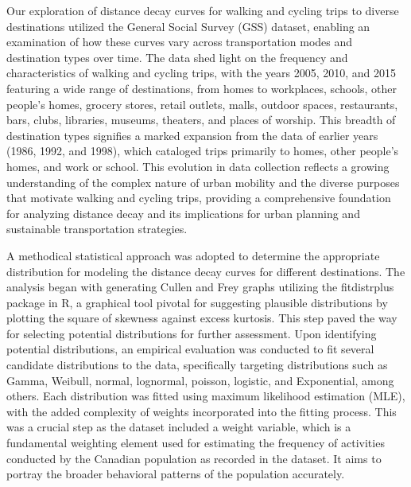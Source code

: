 \documentclass[
11pt, %
oneside, %
english, %
singlespacing, %
]{macthesis} %
\begin{document}
Our exploration of distance decay curves for walking and cycling trips to diverse destinations utilized the General Social Survey (GSS) dataset, enabling an examination of how these curves vary across transportation modes and destination types over time. The data shed light on the frequency and characteristics of walking and cycling trips, with the years 2005, 2010, and 2015 featuring a wide range of destinations, from homes to workplaces, schools, other people's homes, grocery stores, retail outlets, malls, outdoor spaces, restaurants, bars, clubs, libraries, museums, theaters, and places of worship. This breadth of destination types signifies a marked expansion from the data of earlier years (1986, 1992, and 1998), which cataloged trips primarily to homes, other people's homes, and work or school. This evolution in data collection reflects a growing understanding of the complex nature of urban mobility and the diverse purposes that motivate walking and cycling trips, providing a comprehensive foundation for analyzing distance decay and its implications for urban planning and sustainable transportation strategies.

A methodical statistical approach was adopted to determine the appropriate distribution for modeling the distance decay curves for different destinations. The analysis began with generating Cullen and Frey graphs utilizing the fitdistrplus package in R, a graphical tool pivotal for suggesting plausible distributions by plotting the square of skewness against excess kurtosis. This step paved the way for selecting potential distributions for further assessment. Upon identifying potential distributions, an empirical evaluation was conducted to fit several candidate distributions to the data, specifically targeting distributions such as Gamma, Weibull, normal, lognormal, poisson, logistic, and Exponential, among others. Each distribution was fitted using maximum likelihood estimation (MLE), with the added complexity of weights incorporated into the fitting process. This was a crucial step as the dataset included a weight variable, which is a fundamental weighting element used for estimating the frequency of activities conducted by the Canadian population as recorded in the dataset. It aims to portray the broader behavioral patterns of the population accurately.
\end{document}
